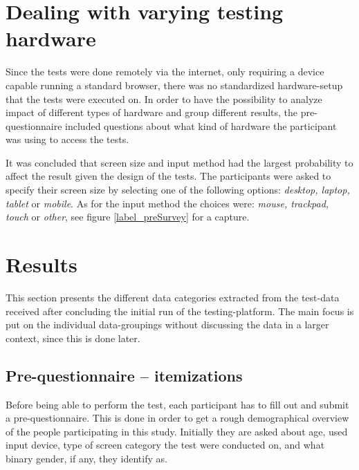 
\section{Dealing with varying testing hardware}\label{label_testingHardware}

  Since the tests were done remotely via the internet, only requiring a
  device capable running a standard browser, there was no standardized
  hardware-setup that the tests were executed on. In order to have the
  possibility to analyze impact of different types of hardware and group
  different results, the pre-questionnaire included questions about what
  kind of hardware the participant was using to access the tests.

  It was concluded that screen size and input method had the largest
  probability to affect the result given the design of the tests.
  The participants were asked to specify their screen size by selecting one
  of the following options: \textit{desktop, laptop, tablet} or
  \textit{mobile}. As for the input method the choices were:
  \textit{mouse, trackpad, touch} or \textit{other}, see figure
  \ref{label_preSurvey} for a capture.


\section{Results}


  This section presents the different data categories extracted from the
  test-data received after concluding the initial run of the testing-platform.
  The main focus is put on the individual data-groupings without discussing the
  data in a larger context, since this is done later.

  \subsection{Pre-questionnaire -- itemizations}

    Before being able to perform the test, each participant has to fill
    out and submit a pre-questionnaire. This is done in order to get
    a rough demographical overview of the people participating in this
    study. Initially they are asked about age, used input device, type of
    screen category the test were conducted on, and what binary gender, if
    any, they identify as.

